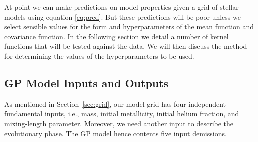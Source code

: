 At point we can make predictions on model properties given a grid of stellar models using equation \ref{eq:pred}.  But these predictions will be poor unless we select sensible values for the form and hyperparameters of the mean function and covariance function.  In the following section we detail a number of kernel functions that will be tested against the data.  We will then discuss the method for determining the values of the hyperparameters to be used.

\subsection{GP Model Inputs and Outputs}

As mentioned in Section~\ref{sec:grid}, our model grid has four independent fundamental inputs, i.e., mass, initial metallicity, initial helium fraction, and mixing-length parameter. Moreover, we need another input to describe the evolutionary phase. The GP model hence contents five input demissions. 

